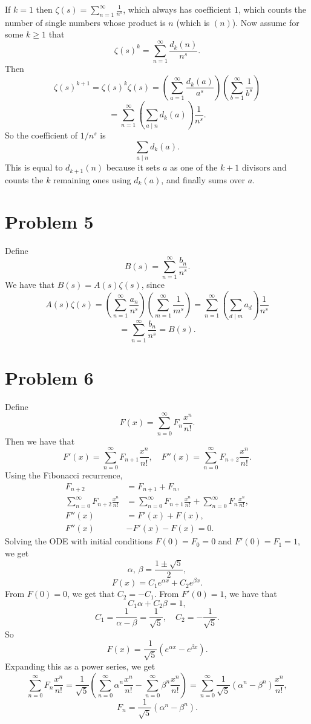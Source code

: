 \documentclass{article}
\newcommand{\bigp}[1]{\left(#1\right)}
\begin{document}
If $k = 1$ then $\zeta(s) = \sum_{n = 1}^\infty \frac{1}{n^s}$, which always has coefficient $1$, which counts the number of single numbers whose product is $n$ (which is $(n)$). Now assume for some $k \ge 1$ that
$$\zeta(s)^k = \sum_{n = 1}^\infty \frac{d_k(n)}{n^s}.$$
Then
$$\zeta(s)^{k + 1} = \zeta(s)^k\zeta(s) = \bigp{\sum_{a = 1}^\infty \frac{d_k(a)}{a^s}}\bigp{\sum_{b = 1}^\infty \frac{1}{b^s}}$$
$$= \sum_{n = 1}^\infty \bigp{\sum_{a \mid n}d_k(a)}\frac{1}{n^s}.$$
So the coefficient of $1/n^s$ is
$$\sum_{a \mid n} d_k(a).$$
This is equal to $d_{k + 1}(n)$ because it sets $a$ as one of the $k + 1$ divisors and counts the $k$ remaining ones using $d_k(a)$, and finally sums over $a$.

\section*{Problem 5}
Define
$$B(s) = \sum_{n = 1}^\infty \frac{b_n}{n^s}.$$
We have that $B(s) = A(s)\zeta(s)$, since
$$A(s)\zeta(s) = \bigp{\sum_{n = 1}^\infty \frac{a_n}{n^s}}\bigp{\sum_{m = 1}^\infty \frac{1}{m^s}} = \sum_{n = 1}^\infty \bigp{\sum_{d \mid m}a_d}\frac{1}{n^s}$$
$$= \sum_{n = 1}^\infty \frac{b_n}{n^s} = B(s).$$

\section*{Problem 6}
Define
$$F(x) = \sum_{n = 0}^\infty F_n \frac{x^n}{n!}.$$
Then we have that
$$F'(x) = \sum_{n = 0}^\infty F_{n + 1} \frac{x^n}{n!}, \quad F''(x) = \sum_{n = 0}^\infty F_{n + 2} \frac{x^n}{n!}.$$
Using the Fibonacci recurrence,
\begin{align*}
F_{n + 2} &= F_{n + 1} + F_n, \\
\sum_{n = 0}^\infty F_{n + 2} \frac{x^n}{n!} &= \sum_{n = 0}^\infty F_{n + 1} \frac{x^n}{n!} + \sum_{n = 0}^\infty F_n \frac{x^n}{n!}, \\
F''(x) &= F'(x) + F(x), \\
F''(x) &- F'(x) - F(x) = 0.
\end{align*}
Solving the ODE with initial conditions $F(0) = F_0 = 0$ and $F'(0) = F_1 = 1$, we get
$$\alpha,\, \beta = \frac{1 \pm \sqrt{5}}{2},$$
$$F(x) = C_1e^{\alpha x} + C_2e^{\beta x}.$$
From $F(0) = 0$, we get that $C_2 = -C_1$. From $F'(0) = 1$, we have that
$$C_1\alpha + C_2\beta = 1,$$
$$C_1 = \frac{1}{\alpha - \beta} = \frac{1}{\sqrt5}, \quad C_2 = -\frac{1}{\sqrt5}.$$
So
$$F(x) = \frac{1}{\sqrt5}(e^{\alpha x} - e^{\beta x}).$$
Expanding this as a power series, we get
$$\sum_{n = 0}^\infty F_n \frac{x^n}{n!} = \frac{1}{\sqrt 5}\bigp{\sum_{n = 0}^\infty \alpha^n \frac{x^n}{n!} - \sum_{n = 0}^\infty \beta^n \frac{x^n}{n!}} = \sum_{n = 0}^\infty \frac{1}{\sqrt 5}(\alpha^n - \beta^n) \frac{x^n}{n!},$$
$$F_n = \frac{1}{\sqrt 5}(\alpha^n - \beta^n).$$
\end{document}
